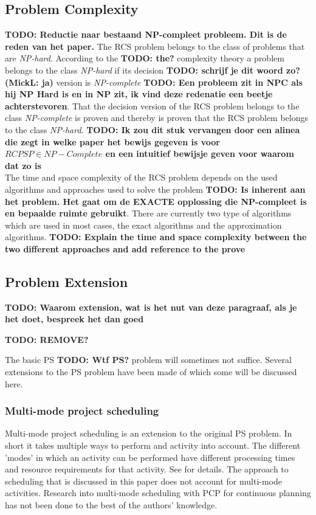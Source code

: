 \documentclass{article}
\newcommand{\TODO}[1]{{\color{red}\textbf{TODO: #1}}}
\begin{document}
\subsection{Problem Complexity}
\TODO{Reductie naar bestaand NP-compleet probleem. Dit is de reden van het paper.}
The RCS problem belongs to the class of problems that are \emph{NP-hard}. According to the \TODO{the?} complexity theory a problem belongs to the class \emph{NP-hard} if its decision \TODO{schrijf je dit woord zo? (MickL: ja)} version is \emph{NP-complete} \TODO{Een probleem zit in NPC als hij NP Hard is en in NP zit, ik vind deze redenatie een beetje achterstevoren}. 
That the decision version of the RCS problem belongs to the class \emph{NP-complete} is proven and thereby is proven that the RCS problem belongs to the class \emph{NP-hard}. 
\TODO{Ik zou dit stuk vervangen door een alinea die zegt in welke paper het bewijs gegeven is voor $RCPSP \in NP-Complete$ en een intuitief bewijsje geven voor waarom dat zo is}\\
The time and space complexity of the RCS problem depends on the used algorithms and approaches used to solve the problem \TODO{Is inherent aan het problem. Het gaat om de EXACTE opplossing die NP-compleet is en bepaalde ruimte gebruikt}. 
There are currently two type of algorithms which are used in most cases, the exact algorithms and the approximation algorithms.
\TODO{Explain the time and space complexity between the two different approaches and add reference to the prove}

\subsection{Problem Extension}
\TODO{Waarom extension, wat is het nut van deze paragraaf, als je het doet, bespreek het dan goed}

\TODO{REMOVE?}

The basic PS \TODO{Wtf PS?} problem will sometimes not suffice. Several extensions to the PS problem have been made of which some will be discussed here. 

\subsubsection{Multi-mode project scheduling}
Multi-mode project scheduling is an extension to the original PS problem.
In short it takes multiple ways to perform and activity into account.
The different 'modes' in which an activity can be performed have different processing times and resource requirements for that activity.
See \citet{herroelen05} for details.
The approach to scheduling that is discussed in this paper does not account for multi-mode activities.
Research into multi-mode scheduling with PCP for continuous planning has not been done to the best of the authors' knowledge. 
\end{document}
